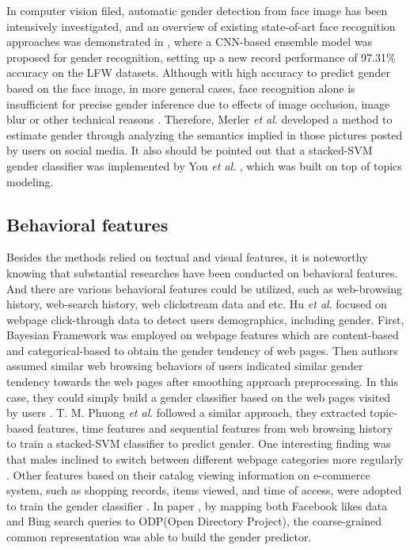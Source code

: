 \documentclass[runningheads]{llncs}
\begin{document}
	In computer vision filed, automatic gender detection from face image has been intensively investigated, and an overview of existing state-of-art face recognition approaches was demonstrated in \cite{antipov2016minimalistic}, where a CNN-based ensemble model was proposed for gender recognition, setting up a new record performance of 97.31\% accuracy on the LFW datasets. Although with high accuracy to predict gender based on the face image, in more general cases, face recognition alone is insufficient for precise gender inference due to effects of image occlusion, image blur or other technical reasons \cite{merler2015you}. Therefore, Merler \textit{et al}. developed a method to estimate gender through analyzing the semantics implied in those pictures posted by users on social media. It also should be pointed out that a stacked-SVM gender classifier was implemented by You \textit{et al}. \cite{you2014eyes}, which was built on top of topics modeling.
	
	\subsection{Behavioral features}
	
	Besides the methods relied on textual and visual features, it is noteworthy knowing that substantial researches have been conducted on behavioral features. And there are various behavioral features could be utilized, such as web-browsing history, web-search history, web clickstream data and etc. Hu \textit{et al}. focused on webpage click-through data to detect user\textquotesingle s demographics, including gender. First, Bayesian Framework was employed on webpage features which are content-based and categorical-based to obtain the gender tendency of web pages. Then authors assumed similar web browsing behaviors of users indicated similar gender tendency towards the web pages after smoothing approach preprocessing. In this case, they could simply build a gender classifier based on the web pages visited by users \cite{hu2007demographic}. T. M. Phuong \textit{et al}. followed a similar approach, they extracted topic-based features, time features and sequential features from web browsing history to train a stacked-SVM classifier to predict gender. One interesting finding was that males inclined to switch between different webpage categories more regularly \cite{phuong2014gender}. Other features based on their catalog viewing information on e-commerce system, such as shopping records, items viewed, and time of access, were adopted to train the gender classifier \cite{duong2016customer}. In paper \cite{bi2013inferring}, by mapping both Facebook likes data and Bing search queries to ODP(Open Directory Project), the coarse-grained common representation was able to build the gender predictor.
	
\end{document}
